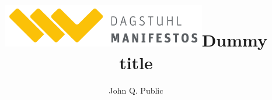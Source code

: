\documentclass[a4paper,USenglish]{dagman-master-v2021}
\title{\includegraphics[width=0.67\textwidth]{dagman-logo-color}}
\begin{document}
\maketitle


\begin{contentslist}

\contitem
\title{Dummy title}
\author{John Q. Public}

\end{contentslist}

\bigskip

\vfill


\bottomline



\end{document}

